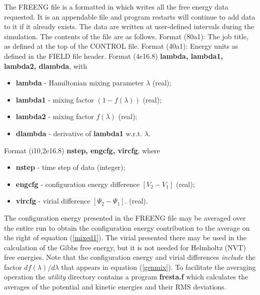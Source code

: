 The FREENG file is a formatted in which \D{} writes all the free energy data
requested. It is an appendable file and program restarts will continue to add
data to it if it already exists. The data are written at user-defined
intervals during the simulation. The contents of the file are as follows.
\newline \newline
{} Format (80a1): The job title, as defined at the top of the
CONTROL file. \newline\newline
{} Format (40a1): Energy units as defined in the FIELD file header. \newline\newline
{} Format (4e16.8)
{\bf lambda, lambda1, lambda2, dlambda}, with
\begin{itemize}
\item {\bf lambda} - Hamiltonian mixing parameter $\lambda$ (real);
\item {\bf lambda1} - mixing factor $(1-f(\lambda))$ (real);
\item {\bf lambda2} - mixing factor $f(\lambda)$ (real);
\item {\bf dlambda} - derivative of {\bf lambda1} w.r.t. $\lambda$.
\end{itemize}
 Format (i10,2e16.8) {\bf nstep, engcfg, vircfg}, where
\begin{itemize}
\item {\bf nstep} - time step of data (integer);
\item {\bf engcfg} - configuration energy difference $[V_{2}-V_{1}]$ (real);
\item {\bf vircfg} - virial difference $[\Psi_{2}-\Psi_{1}]$. (real).
\end{itemize}
The configuration energy presented in the FREENG file may be averaged over the
entire run to obtain the configuration energy contribution to the average on
the right of equation (\ref{mixed1}). The virial presented there may be used
in the calculation of the Gibbs free energy, but it is not needed for
Helmholtz (NVT) free energies.  Note that the configuration energy and virial
differences {\em include} the factor $d f(\lambda)/d \lambda$ that appears in
equation (\ref{genmix}).  To facilitate the averaging operation the \D{} {\em
  utility} directory contains a program {\bf fresta.f} which calculates the
averages of the potential and kinetic energies and their RMS deviations.

